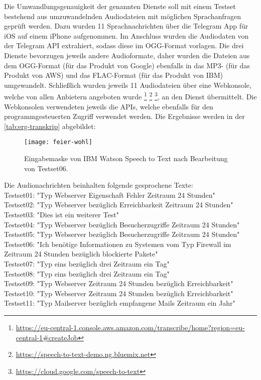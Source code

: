 Die Umwandlungsgenauigkeit der genannten Dienste soll mit einem Testset bestehend aus umzuwandelnden Audiodateien mit möglichen Sprachanfragen geprüft werden. Dazu wurden 11 Sprachnachrichten über die Telegram App für iOS auf einem iPhone aufgenommen. Im Anschluss wurden die Audiodaten von der Telegram API extrahiert, sodass diese im OGG-Format vorlagen. Die drei Dienste bevorzugen jeweils andere Audioformate, daher wurden die Dateien aus dem OGG-Format (für das Produkt von Google) ebenfalls in das MP3- (für das Produkt von AWS) und das FLAC-Format (für das Produkt von IBM) umgewandelt. Schließlich wurden jeweils 11 Audiodateien über eine Webkonsole, welche von allen Anbietern angeboten wurde \footnote{\url{https://eu-central-1.console.aws.amazon.com/transcribe/home?region=eu-central-1\#createJob}} \footnote{\url{https://speech-to-text-demo.ng.bluemix.net}} \footnote{\url{https://cloud.google.com/speech-to-text}}, an den Dienst übermittelt. Die Webkonsolen verwendeten jeweils die APIs, welche ebenfalls für den programmgesteuerten Zugriff verwendet werden. Die Ergebnisse werden in der \autoref{tab:erg-transkrip} abgebildet:

\begin{figure}[h!]
\centering
\texttt{[image: feier-wohl]}
\caption{Eingabemaske von IBM Watson Speech to Text nach Bearbeitung von Testset06.}
\label{fig:feier-wohl}
\end{figure}

Die Audionachrichten beinhalten folgende gesprochene Texte: \\
Testset01: "Typ Webserver Eigenschaft Fehler Zeitraum 24 Stunden" \\
Testset02: "Typ Webserver bezüglich Erreichbarkeit Zeitraum 24 Stunden" \\
Testset03: "Dies ist ein weiterer Test" \\
Testset04: "Typ Webserver bezüglich Besucherzugriffe Zeitraum 24 Stunden" \\
Testset05: "Typ Webserver bezüglich Besucherzugriffe Zeitraum 24 Stunden" \\
Testset06: "Ich benötige Informationen zu Systemen vom Typ Firewall im Zeitraum 24 Stunden bezüglich blockierte Pakete" \\
Testset07: "Typ eins bezüglich drei Zeitraum ein Tag" \\
Testset08: "Typ eins bezüglich drei Zeitraum ein Tag" \\
Testset09: "Typ Webserver Zeitraum 24 Stunden bezüglich Erreichbarkeit" \\
Testset10: "Typ Webserver Zeitraum 24 Stunden bezüglich Erreichbarkeit" \\
Testset11: "Typ Mailserver bezüglich empfangene Mails Zeitraum ein Jahr" \\


